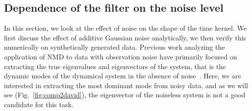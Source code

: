 \documentclass[%
 reprint,
 amsmath,amssymb,
 aps,
]{revtex4-2}
\begin{document}

\subsection{Dependence of the filter on the noise level}
In this section, we look at the effect of noise on the shape of the time kernel. We first discuss the effect of additive Gaussian noise analytically, we then verify this numerically on synthetically generated data. Previous work analyzing the application of NMD to data with observation noise have primarily focused on extracting the true eigenvalues and eigenvectors of the system, that is the dynamic modes of the dynamical system in the absence of noise~\cite{noisy_dmd,stable_noisy_dmd}. Here, we are interested in extracting the most dominant mode from noisy data, and as we will see (Fig.~\ref{fig:comp2david}), the eigenvector of the noiseless system is not a good candidate for this task.
\end{document}
